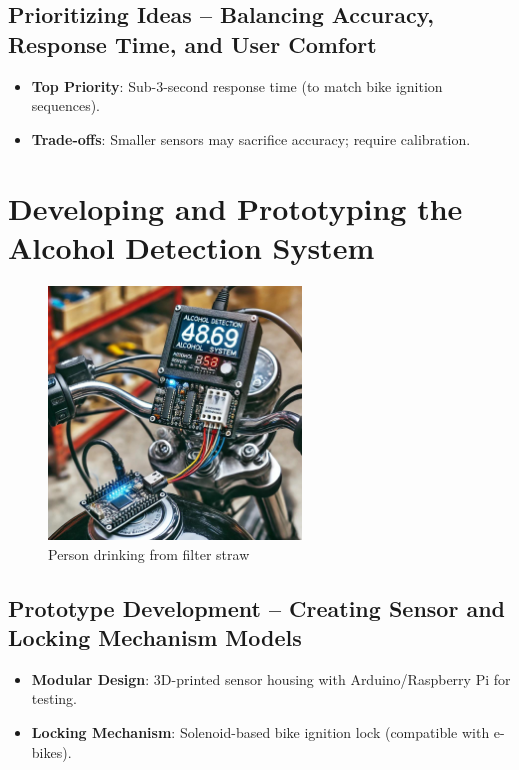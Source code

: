 \documentclass{article}
\begin{document}
\subsection{Prioritizing Ideas -- Balancing Accuracy, Response Time, and User Comfort}
\begin{itemize}
    \item \textbf{Top Priority}: Sub-3-second response time (to match bike ignition sequences).
    \item \textbf{Trade-offs}: Smaller sensors may sacrifice accuracy; require calibration.
\end{itemize}

\newpage

\section{Developing and Prototyping the Alcohol Detection System}

\begin{figure}[h!]
    \centering
    \includegraphics[width=0.6\textwidth]{4.jpg}
    \caption{Person drinking from filter straw}
    \label{fig:Drinking_water}
\end{figure}


\subsection{Prototype Development -- Creating Sensor and Locking Mechanism Models}
\begin{itemize}
    \item \textbf{Modular Design}: 3D-printed sensor housing with Arduino/Raspberry Pi for testing.
    \item \textbf{Locking Mechanism}: Solenoid-based bike ignition lock (compatible with e-bikes).
\end{itemize}
\end{document}
